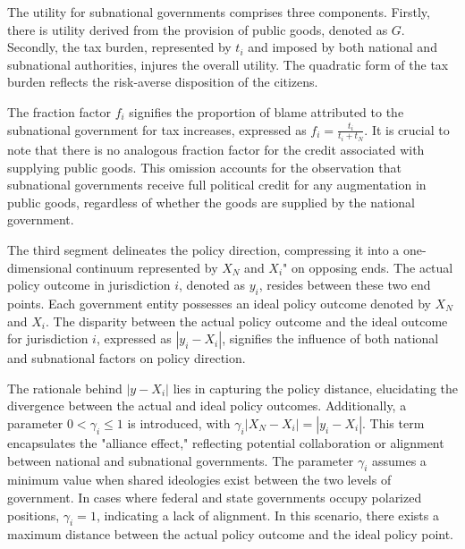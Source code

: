 \documentclass[man]{apa7}
\begin{document}
The utility for subnational governments comprises three components. Firstly, there is utility derived from the provision of public goods, denoted as $G$. Secondly, the tax burden, represented by $t_i$ and imposed by both national and subnational authorities, injures the overall utility. The quadratic form of the tax burden reflects the risk-averse disposition of the citizens.

The fraction factor $f_i$ signifies the proportion of blame attributed to the subnational government for tax increases, expressed as $f_i=\frac{t_i}{t_i+t_N}$. It is crucial to note that there is no analogous fraction factor for the credit associated with supplying public goods. This omission accounts for the observation that subnational governments receive full political credit for any augmentation in public goods, regardless of whether the goods are supplied by the national government.%


The third segment delineates the policy direction, compressing it into a one-dimensional continuum represented by $X_N$ and $X_i$" on opposing ends. The actual policy outcome in jurisdiction $i$, denoted as $y_i$, resides between these two end points. Each government entity possesses an ideal policy outcome denoted by $X_N$ and $X_i$. The disparity between the actual policy outcome and the ideal outcome for jurisdiction $i$, expressed as $|y_i-X_i|$, signifies the influence of both national and subnational factors on policy direction.

The rationale behind $|y-X_i|$ lies in capturing the policy distance, elucidating the divergence between the actual and ideal policy outcomes. Additionally, a parameter $0<\gamma_i\leq 1$ is introduced, with $\gamma_i|X_N-X_i|=|y_i-X_i|$. This term encapsulates the "alliance effect," reflecting potential collaboration or alignment between national and subnational governments. The parameter $\gamma_i$ assumes a minimum value when shared ideologies exist between the two levels of government. In cases where federal and state governments occupy polarized positions, $\gamma_i=1$, indicating a lack of alignment. In this scenario, there exists a maximum distance between the actual policy outcome and the ideal policy point.%
\end{document}
